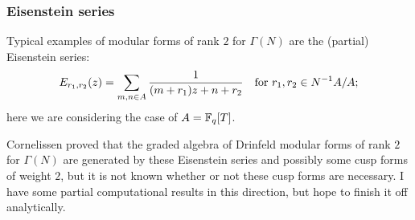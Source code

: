 \begin{frame} \frametitle{Eisenstein series}
  Typical examples of modular forms of rank $2$ for $\Gamma(N)$ are the (partial) Eisenstein series:
  \[ E_{r_1,r_2}(z) = \sum_{m,n \in A} \frac{1}{(m+r_1)z+n+r_2} \quad\text{for}\  r_1,r_2 \in N^{-1}A/A; \]
  here we are considering the case of $A = \mathbb{F}_q[T]$. \pause

  Cornelissen proved that the graded algebra of Drinfeld modular forms of rank $2$ for $\Gamma(N)$ are generated by these Eisenstein series and possibly some cusp forms of weight $2$, but it is not known whether or not these cusp forms are necessary. \pause
  I have some partial computational results in this direction, but hope to finish it off analytically.
\end{frame}